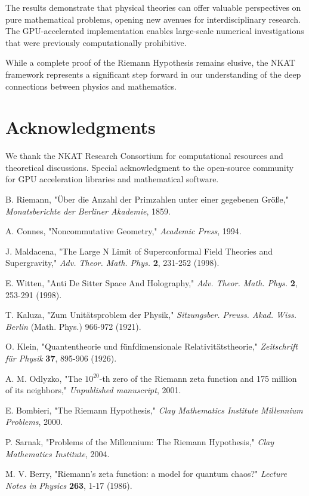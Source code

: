 \documentclass[12pt,a4paper]{article}
\begin{document}
The results demonstrate that physical theories can offer valuable perspectives on pure mathematical problems, opening new avenues for interdisciplinary research. The GPU-accelerated implementation enables large-scale numerical investigations that were previously computationally prohibitive.

While a complete proof of the Riemann Hypothesis remains elusive, the NKAT framework represents a significant step forward in our understanding of the deep connections between physics and mathematics.

\section*{Acknowledgments}

We thank the NKAT Research Consortium for computational resources and theoretical discussions. Special acknowledgment to the open-source community for GPU acceleration libraries and mathematical software.

\begin{thebibliography}{99}

B. Riemann, "Über die Anzahl der Primzahlen unter einer gegebenen Größe," 
\textit{Monatsberichte der Berliner Akademie}, 1859.

A. Connes, "Noncommutative Geometry," 
\textit{Academic Press}, 1994.

J. Maldacena, "The Large N Limit of Superconformal Field Theories and Supergravity," 
\textit{Adv. Theor. Math. Phys.} \textbf{2}, 231-252 (1998).

E. Witten, "Anti De Sitter Space And Holography," 
\textit{Adv. Theor. Math. Phys.} \textbf{2}, 253-291 (1998).

T. Kaluza, "Zum Unitätsproblem der Physik," 
\textit{Sitzungsber. Preuss. Akad. Wiss. Berlin} (Math. Phys.) 966-972 (1921).

O. Klein, "Quantentheorie und fünfdimensionale Relativitätstheorie," 
\textit{Zeitschrift für Physik} \textbf{37}, 895-906 (1926).

A. M. Odlyzko, "The $10^{20}$-th zero of the Riemann zeta function and 175 million of its neighbors," 
\textit{Unpublished manuscript}, 2001.

E. Bombieri, "The Riemann Hypothesis," 
\textit{Clay Mathematics Institute Millennium Problems}, 2000.

P. Sarnak, "Problems of the Millennium: The Riemann Hypothesis," 
\textit{Clay Mathematics Institute}, 2004.

M. V. Berry, "Riemann's zeta function: a model for quantum chaos?" 
\textit{Lecture Notes in Physics} \textbf{263}, 1-17 (1986).

\end{thebibliography}
\end{document}
